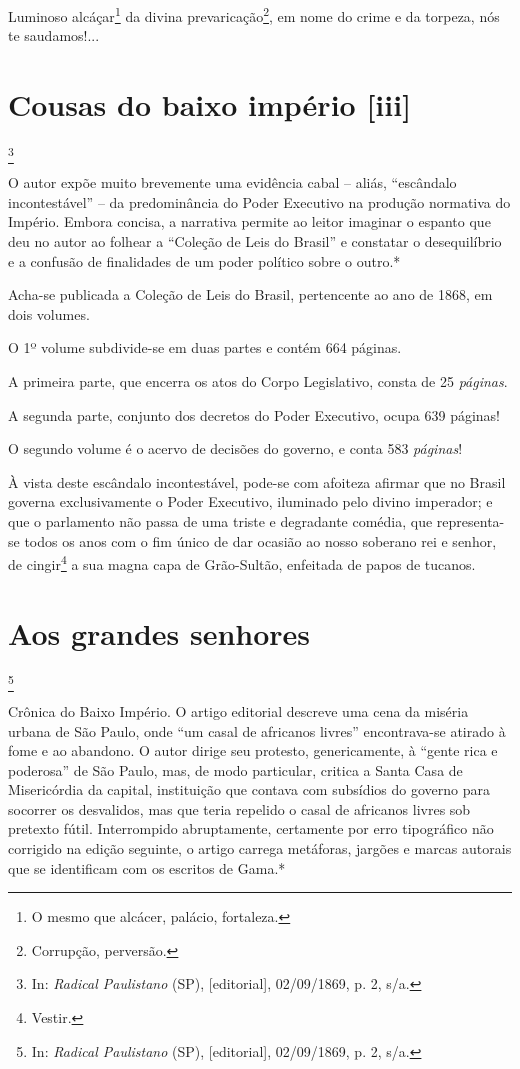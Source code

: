 Luminoso alcáçar\footnote{O mesmo que alcácer, palácio, fortaleza.} da
divina prevaricação\footnote{Corrupção, perversão.}, em nome do crime
e da torpeza, nós te saudamos!...

\chapter{Cousas do baixo império {[}iii{]}}\footnote{In: \emph{Radical
  Paulistano} (SP), {[}editorial{]}, 02/09/1869, p. 2, s/a.}

\begin{didascalia}
O autor expõe muito brevemente uma evidência cabal -- aliás, ``escândalo
incontestável'' -- da predominância do Poder Executivo na produção
normativa do Império. Embora concisa, a narrativa permite ao leitor
imaginar o espanto que deu no autor ao folhear a ``Coleção de Leis do
Brasil'' e constatar o desequilíbrio e a confusão de finalidades de um
poder político sobre o outro.*
\end{didascalia}

\asterisc{}

Acha-se publicada a Coleção de Leis do Brasil, pertencente ao ano de
1868, em dois volumes.

O 1º volume subdivide-se em duas partes e contém 664 páginas.

A primeira parte, que encerra os atos do Corpo Legislativo, consta de 25
\emph{páginas}.

A segunda parte, conjunto dos decretos do Poder Executivo, ocupa 639
páginas!

O segundo volume é o acervo de decisões do governo, e conta 583
\emph{páginas}!

À vista deste escândalo incontestável, pode-se com afoiteza afirmar que
no Brasil governa exclusivamente o Poder Executivo, iluminado pelo
divino imperador; e que o parlamento não passa de uma triste e
degradante comédia, que representa-se todos os anos com o fim único de
dar ocasião ao nosso soberano rei e senhor, de cingir\footnote{Vestir.}
a sua magna capa de Grão-Sultão, enfeitada de papos de tucanos.

\chapter{Aos grandes senhores}\footnote{In: \emph{Radical Paulistano} (SP),
  {[}editorial{]}, 02/09/1869, p. 2, s/a.}

\begin{didascalia}
Crônica do Baixo Império. O artigo editorial descreve uma cena da
miséria urbana de São Paulo, onde ``um casal de africanos livres''
encontrava-se atirado à fome e ao abandono. O autor dirige seu protesto,
genericamente, à ``gente rica e poderosa'' de São Paulo, mas, de modo
particular, critica a Santa Casa de Misericórdia da capital, instituição
que contava com subsídios do governo para socorrer os desvalidos, mas
que teria repelido o casal de africanos livres sob pretexto fútil.
Interrompido abruptamente, certamente por erro tipográfico não corrigido
na edição seguinte, o artigo carrega metáforas, jargões e marcas
autorais que se identificam com os escritos de Gama.*
\end{didascalia}

